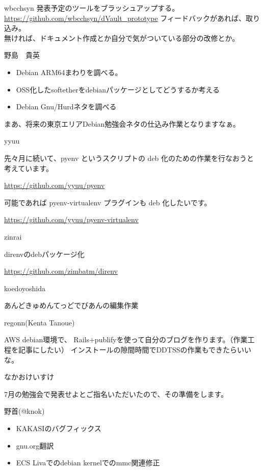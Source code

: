\begin{prework}{ wbcchsyn }
発表予定のツールをブラッシュアップする。\\
\url{https://github.com/wbcchsyn/dVault\_prototype}
フィードバックがあれば、取り込み。\\
無ければ、ドキュメント作成とか自分で気がついている部分の改修とか。
\end{prework}

\begin{prework}{ 野島　貴英 }
\begin{itemize}
\item Debian ARM64まわりを調べる。
\item OSS化したsoftetherをdebianパッケージとしてどうするか考える
\item Debian Gnu/Hurdネタを調べる
\end{itemize}

 まあ、将来の東京エリアDebian勉強会ネタの仕込み作業となりますなぁ。
\end{prework}

\begin{prework}{ yyuu }

 先々月に続いて、pyenv というスクリプトの deb 化のための作業を行なおうと考えています。

 \url{https://github.com/yyuu/pyenv}

 可能であれば pyenv-virtualenv プラグインも deb 化したいです。

 \url{https://github.com/yyuu/pyenv-virtualenv}

\end{prework}

\begin{prework}{ zinrai }

direnvのdebパッケージ化

\url{https://github.com/zimbatm/direnv}

\end{prework}

\begin{prework}{ koedoyoshida }

あんどきゅめんてっどでびあんの編集作業

\end{prework}

\begin{prework}{ regonn(Kenta Tanoue) }

AWS debian環境で、
Rails+publifyを使って自分のブログを作ります。（作業工程を記事にしたい）
インストールの隙間時間でDDTSSの作業もできたらいいな。
\end{prework}

\begin{prework}{ なかおけいすけ }

7月の勉強会で発表せよとご指名いただいたので、その準備をします。

\end{prework}

\begin{prework}{ 野首(@knok) }

\begin{itemize}
\item KAKASIのバグフィックス
\item gnu.org翻訳
\item ECS Livaでのdebian kernelでのmmc関連修正
\end{itemize}

\end{prework}
